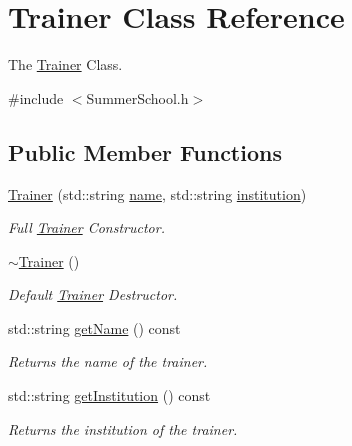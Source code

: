 \hypertarget{classTrainer}{}\section{Trainer Class Reference}
\label{classTrainer}


The \mbox{\hyperlink{classTrainer}{Trainer}} Class.  




{\ttfamily \#include $<$Summer\+School.\+h$>$}

\subsection*{Public Member Functions}
\begin{DoxyCompactItemize}
\item 
\mbox{\hyperlink{classTrainer_ae033382eaedd47966c8667439376369a}{Trainer}} (std\+::string \mbox{\hyperlink{classTrainer_a6b58d4cfdb8d3482cb2c09dd366a6350}{name}}, std\+::string \mbox{\hyperlink{classTrainer_ae895aa7f146d8bf271399215d4ede36b}{institution}})
\begin{DoxyCompactList}\small\item\em Full \mbox{\hyperlink{classTrainer}{Trainer}} Constructor. \end{DoxyCompactList}\item 
\mbox{\hyperlink{classTrainer_aa3d993d1eb090f4111e12a710fe9d3f6}{$\sim$\+Trainer}} ()
\begin{DoxyCompactList}\small\item\em Default \mbox{\hyperlink{classTrainer}{Trainer}} Destructor. \end{DoxyCompactList}\item 
std\+::string \mbox{\hyperlink{classTrainer_a4bf23e8eaefc7c2f400b4ba14f2e1c69}{get\+Name}} () const
\begin{DoxyCompactList}\small\item\em Returns the name of the trainer. \end{DoxyCompactList}\item 
std\+::string \mbox{\hyperlink{classTrainer_a92ce4244bea56ae32c0ba33fdd959667}{get\+Institution}} () const
\begin{DoxyCompactList}\small\item\em Returns the institution of the trainer. \end{DoxyCompactList}\end{DoxyCompactItemize}
